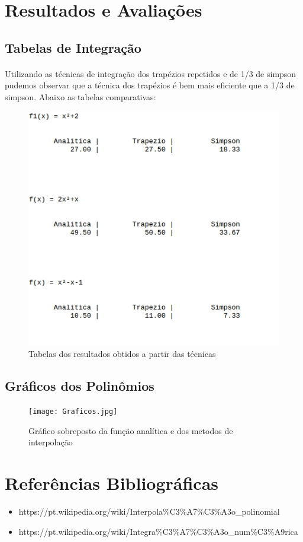 \documentclass{article}
\begin{document}
\section{Resultados e Avalia\c c\~oes}
	\subsection{Tabelas de Integra\c c\~ao}
	\paragraph{}Utilizando as t\'ecnicas de integra\c c\~ao dos trap\'ezios repetidos e de 1/3 de simpson pudemos observar que a t\'ecnica dos
	trap\'ezios \'e bem mais eficiente que a 1/3 de simpson. Abaixo as tabelas comparativas:
	\begin{figure}[h!]
		\includegraphics[width=\linewidth]{TabelaInts.jpg}
		\caption{Tabelas dos resultados obtidos a partir das t\'ecnicas}
		\end{figure}
\newpage
	\subsection{Gr\'aficos dos Polin\^omios}
	\begin{figure}[h!]
		\texttt{[image: Graficos.jpg]}
		\caption{Gr\'afico sobreposto da fun\c c\~ao anal\'itica e dos metodos de interpola\c c\~ao}
		\end{figure}
\newpage
\section{Refer\^encias Bibliogr\'aficas}
\begin{itemize}
\item
https://pt.wikipedia.org/wiki/Interpola\%C3\%A7\%C3\%A3o\_polinomial
\item
https://pt.wikipedia.org/wiki/Integra\%C3\%A7\%C3\%A3o\_num\%C3\%A9rica
\end{itemize}
\newpage
\end{document}
